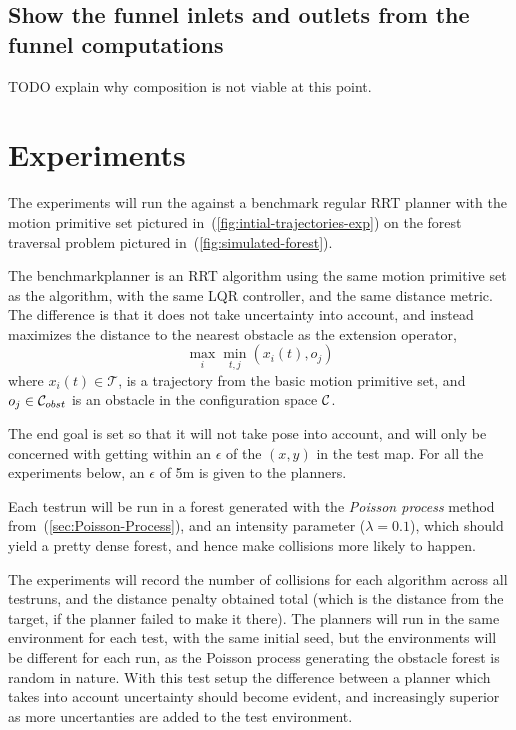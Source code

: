 \subsection{Show the funnel inlets and outlets from the funnel computations}

TODO explain why composition is not viable at this point.

\section{Experiments}

The experiments will run the \rrtfunnel{} against a benchmark regular RRT
planner with the motion primitive set pictured
in~(\ref{fig:intial-trajectories-exp}) on the forest traversal problem pictured
in~(\ref{fig:simulated-forest}).

The benchmarkplanner is an \ac{RRT} algorithm
using the same motion primitive set as the \rrtfunnel{} algorithm, with the same
\ac{LQR} controller, and the same distance metric. The difference is that it
does not take uncertainty into account, and instead maximizes the distance to
the nearest obstacle as the extension operator, \ie{}
\begin{equation}
  \max_{i}\min_{t,j}(x_{i}(t), o_{j})
\end{equation}
where \(x_{i}(t) \in \mathcal{T}\), is a trajectory from the basic motion
primitive set, and \(o_{j} \in \mathcal{C}_{obst}{}\) is an obstacle
in the configuration space \(\mathcal{C}{}\).

The end goal is set so that it will not take pose into account, and will only be
concerned with getting within an \(\epsilon\) of the \((x,y)\) in the test map.
For all the experiments below, an \(\epsilon\) of 5\si{\metre} is given to the
planners.

Each testrun will be run in a forest generated with the \textit{Poisson process}
method from~(\ref{sec:Poisson-Process}), and an intensity parameter (\(\lambda =
0.1\)), which should yield a pretty dense forest, and hence make collisions more
likely to happen.

The experiments will record the number of collisions for each algorithm across
all testruns, and the distance penalty obtained total (which is the distance
from the target, if the planner failed to make it there). The planners will run
in the same environment for each test, with the same initial seed, but the
environments will be different for each run, as the Poisson process generating
the obstacle forest is random in nature. With this test setup the difference
between a planner which takes into account uncertainty should become evident,
and increasingly superior as more uncertanties are added to the test
environment.

